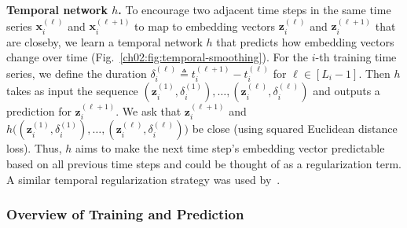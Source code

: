 \noindent
\textbf{Temporal network $h$.}
To encourage two adjacent time steps in the same time series $\mathbf{x}_i^{(\ell)}$ and $\mathbf{x}_i^{(\ell+1)}$ to map to embedding vectors $\mathbf{z}_i^{(\ell)}$ and $\mathbf{z}_i^{(\ell+1)}$ that are closeby, we learn a temporal network $h$ that predicts how embedding vectors change over time (Fig.~\ref{ch02:fig:temporal-smoothing}). 
For the \mbox{$i$-th} training time series, we define the duration $\delta_i^{(\ell)}\triangleq t_i^{(\ell+1)} - t_i^{(\ell)}$ for $\ell\in[L_i-1]$.
Then $h$ takes as input the sequence $(\mathbf{z}_i^{(1)},\delta_i^{(1)}),\dots,(\mathbf{z}_i^{(\ell)},\delta_i^{(\ell)})$ and outputs a prediction for $\mathbf{z}_i^{(\ell+1)}$.
We ask that $\mathbf{z}_i^{(\ell+1)}$ and $h\big((\mathbf{z}_i^{(1)},\delta_i^{(1)}),\dots,(\mathbf{z}_i^{(\ell)},\delta_i^{(\ell)})\big)$ be close (using squared Euclidean distance loss).
Thus, $h$ aims to make the next time step's embedding vector predictable based on all previous time steps and could be thought of as a regularization term. 
A similar temporal regularization strategy was used by~\citet{lee2019dynamic}.


\subsubsection{Overview of Training and Prediction}
\label{ch02:sec:training}
 





